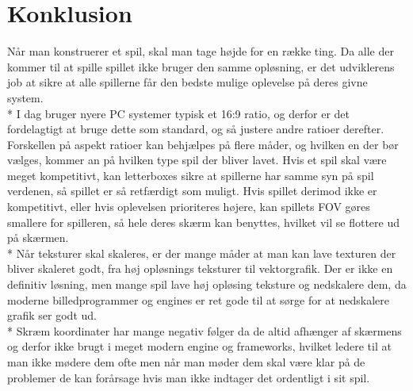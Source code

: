 \documentclass[main.tex]{Konklusion}
\begin{document}
\chapter{Konklusion}
Når man konstruerer et spil, skal man tage højde for en række ting. Da alle der kommer til at spille spillet ikke bruger den samme opløsning, er det udviklerens job at sikre at alle spillerne får den bedste mulige oplevelse på deres givne system.\\*
I dag bruger nyere PC systemer typisk et 16:9 ratio, og derfor er det fordelagtigt at bruge dette som standard, og så justere andre ratioer derefter. Forskellen på aspekt ratioer kan behjælpes på flere måder, og hvilken en der bør vælges, kommer an på hvilken type spil der bliver lavet. Hvis et spil skal være meget kompetitivt, kan letterboxes sikre at spillerne har samme syn på spil verdenen, så spillet er så retfærdigt som muligt. Hvis spillet derimod ikke er kompetitivt, eller hvis oplevelsen prioriteres højere, kan spillets FOV gøres smallere for spilleren, så hele deres skærm kan benyttes, hvilket vil se flottere ud på skærmen. \\*
Når teksturer skal skaleres, er der mange måder at man kan lave texturen der bliver skaleret godt, fra høj opløsnings teksturer til vektorgrafik. Der er ikke en definitiv løsning, men mange spil lave høj opløsing teksture og nedskalere dem, da moderne billedprogrammer og engines er ret gode til at sørge for at nedskalere grafik ser godt ud.\\*  
Skræm koordinater har mange negativ følger da de altid afhænger af skærmens  og  derfor ikke brugt i meget modern engine og frameworks, hvilket ledere til at man ikke mødere dem ofte men når man møder dem skal være klar på de problemer de kan forårsage hvis man ikke indtager det ordentligt i sit spil. 
\end{document}
